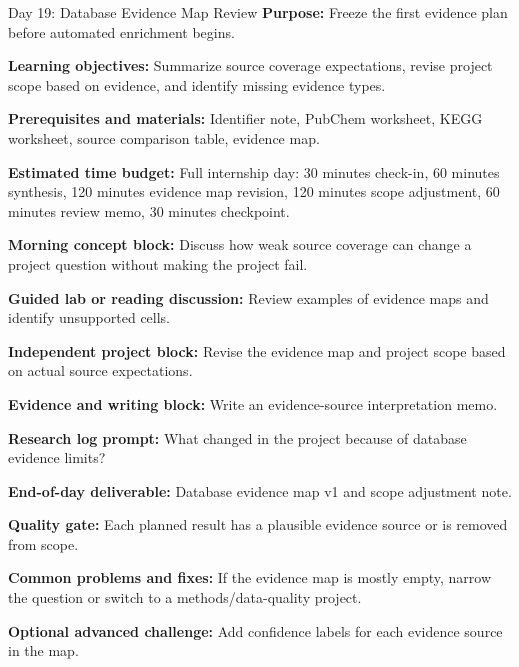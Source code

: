 \begin{dailybox}{Day 19: Database Evidence Map Review}
\textbf{Purpose:} Freeze the first evidence plan before automated enrichment begins.

\textbf{Learning objectives:} Summarize source coverage expectations, revise project scope based on evidence, and identify missing evidence types.

\textbf{Prerequisites and materials:} Identifier note, PubChem worksheet, KEGG worksheet, source comparison table, evidence map.

\textbf{Estimated time budget:} Full internship day: 30 minutes check-in, 60 minutes synthesis, 120 minutes evidence map revision, 120 minutes scope adjustment, 60 minutes review memo, 30 minutes checkpoint.

\textbf{Morning concept block:} Discuss how weak source coverage can change a project question without making the project fail.

\textbf{Guided lab or reading discussion:} Review examples of evidence maps and identify unsupported cells.

\textbf{Independent project block:} Revise the evidence map and project scope based on actual source expectations.

\textbf{Evidence and writing block:} Write an evidence-source interpretation memo.

\textbf{Research log prompt:} What changed in the project because of database evidence limits?

\textbf{End-of-day deliverable:} Database evidence map v1 and scope adjustment note.

\textbf{Quality gate:} Each planned result has a plausible evidence source or is removed from scope.

\textbf{Common problems and fixes:} If the evidence map is mostly empty, narrow the question or switch to a methods/data-quality project.

\textbf{Optional advanced challenge:} Add confidence labels for each evidence source in the map.
\end{dailybox}

